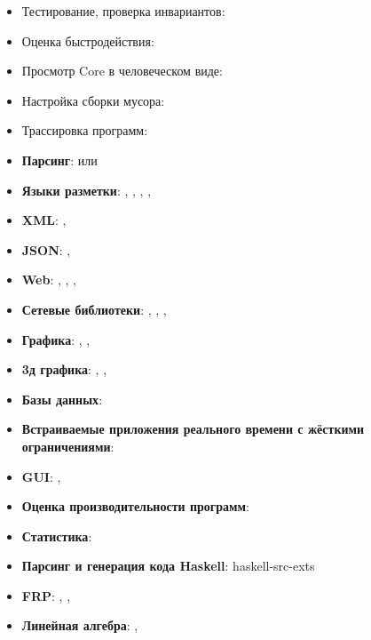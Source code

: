 
\begin{itemize}
\item
  Тестирование, проверка инвариантов: 
\item
  Оценка быстродействия: 
\item
  Просмотр Core в человеческом виде: 
\item
  Настройка сборки мусора: 
\item
  Трассировка программ: 
\end{itemize}


\begin{itemize}
\item
  \textbf{Парсинг}:  или 
\item
  \textbf{Языки разметки}: , , ,
  , 
\item
  \textbf{XML}: , 
\item
  \textbf{JSON}: , 
\item
  \textbf{Web}: , , , 
\item
  \textbf{Сетевые библиотеки}: , , ,
\item
  \textbf{Графика}: , , 
\item
  \textbf{3д графика}: , , 
\item
  \textbf{Базы данных}: 
\item
  \textbf{Встраиваемые приложения реального времени с жёсткими
  ограничениями}: 
\item
  \textbf{GUI}: , 
\item
  \textbf{Оценка производительности программ}: 
\item
  \textbf{Статистика}: 
\item
  \textbf{Парсинг и генерация кода Haskell}: haskell-src-exts
\item
  \textbf{FRP}: , , 
\item
  \textbf{Линейная алгебра}: , 
\end{itemize}

\newpage {}

